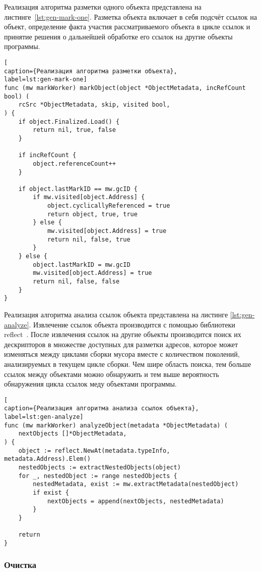 Реализация алгоритма разметки одного объекта представлена на листинге~\ref{lst:gen-mark-one}. Разметка объекта включает в себя подсчёт ссылок на объект, определение факта участия рассматриваемого объекта в цикле ссылок и принятие решения о дальнейшей обработке его ссылок на другие объекты программы.

\begin{lstlisting}[
caption={Реализация алгоритма разметки объекта},
label=lst:gen-mark-one]
func (mw markWorker) markObject(object *ObjectMetadata, incRefCount bool) (
	rcSrc *ObjectMetadata, skip, visited bool,
) {
	if object.Finalized.Load() {
		return nil, true, false
	}
	
	if incRefCount {
		object.referenceCount++
	}
	
	if object.lastMarkID == mw.gcID {
		if mw.visited[object.Address] {
			object.cyclicallyReferenced = true
			return object, true, true
		} else {
			mw.visited[object.Address] = true
			return nil, false, true
		}
	} else {
		object.lastMarkID = mw.gcID
		mw.visited[object.Address] = true
		return nil, false, false
	}
}
\end{lstlisting}

Реализация алгоритма анализа ссылок объекта представлена на листинге \ref{lst:gen-analyze}. Извлечение ссылок объекта производится с помощью библиотеки reflect~\cite{golang_reflect}. После извлечения ссылок на другие объекты производится поиск их дескрипторов в множестве доступных для разметки адресов, которое может изменяться между циклами сборки мусора вместе с количеством поколений, анализируемых в текущем цикле сборки. Чем шире область поиска, тем больше ссылок между объектами можно обнаружить и тем выше вероятность обнаружения цикла ссылок меду объектами программы.

\begin{lstlisting}[
caption={Реализация алгоритма анализа ссылок объекта},
label=lst:gen-analyze]
func (mw markWorker) analyzeObject(metadata *ObjectMetadata) (
	nextObjects []*ObjectMetadata,
) {
	object := reflect.NewAt(metadata.typeInfo, metadata.Address).Elem()
	nestedObjects := extractNestedObjects(object)
	for _, nestedObject := range nestedObjects {
		nestedMetadata, exist := mw.extractMetadata(nestedObject)
		if exist {
			nextObjects = append(nextObjects, nestedMetadata)
		}
	}
	
	return
}
\end{lstlisting}



\subsubsection*{Очистка}

